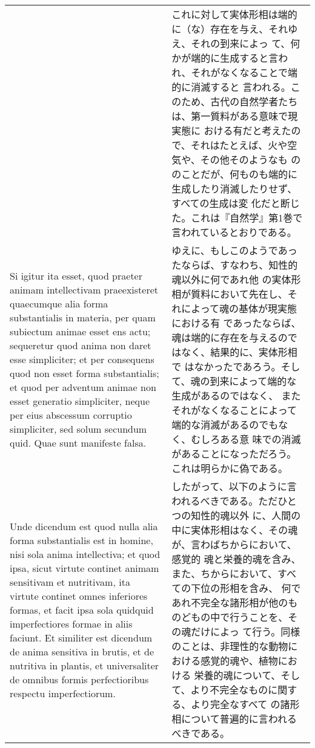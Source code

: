 \documentclass[paper=a4paper,fontsize=10pt,jafontsize=9pt,titlepage]{jlreq}
\begin{document}
\begin{longtable}{p{21em}p{21em}}
&

これに対して実体形相は端的に（な）存在を与え、それゆえ、それの到来によっ
て、何かが端的に生成すると言われ、それがなくなることで端的に消滅すると
言われる。このため、古代の自然学者たちは、第一質料がある意味で現実態に
おける有だと考えたので、それはたとえば、火や空気や、その他そのようなも
ののことだが、何ものも端的に生成したり消滅したりせず、すべての生成は変
化だと断じた。これは『自然学』第1巻で言われているとおりである。
 
\\

Si igitur ita esset, quod praeter animam intellectivam praeexisteret
quaecumque alia forma substantialis in materia, per quam subiectum
animae esset ens actu; sequeretur quod anima non daret esse
simpliciter; et per consequens quod non esset forma substantialis; et
quod per adventum animae non esset generatio simpliciter, neque per
eius abscessum corruptio simpliciter, sed solum secundum quid. Quae
 sunt manifeste falsa.

 &

ゆえに、もしこのようであったならば、すなわち、知性的魂以外に何であれ他
の実体形相が質料において先在し、それによって魂の基体が現実態における有
であったならば、魂は端的に存在を与えるのではなく、結果的に、実体形相で
はなかったであろう。そして、魂の到来によって端的な生成があるのではなく、
またそれがなくなることによって端的な消滅があるのでもなく、むしろある意
味での消滅があることになっただろう。これは明らかに偽である。
 
\\

Unde dicendum est quod nulla alia forma substantialis est in homine,
nisi sola anima intellectiva; et quod ipsa, sicut virtute continet
animam sensitivam et nutritivam, ita virtute continet omnes inferiores
formas, et facit ipsa sola quidquid imperfectiores formae in aliis
faciunt. Et similiter est dicendum de anima sensitiva in brutis, et de
nutritiva in plantis, et universaliter de omnibus formis
perfectioribus respectu imperfectiorum.

&

 したがって、以下のように言われるべきである。ただひとつの知性的魂以外
 に、人間の中に実体形相はなく、その魂が、言わばちからにおいて、感覚的
 魂と栄養的魂を含み、また、ちからにおいて、すべての下位の形相を含み、
 何であれ不完全な諸形相が他のものどもの中で行うことを、その魂だけによっ
 て行う。同様のことは、非理性的な動物における感覚的魂や、植物における
 栄養的魂について、そして、より不完全なものに関する、より完全なすべて
 の諸形相について普遍的に言われるべきである。
 

\end{longtable}
\end{document}
